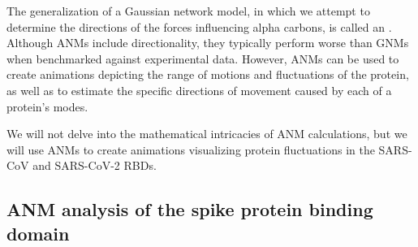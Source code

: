 The generalization of a Gaussian network model, in which we attempt to determine the directions of the forces influencing alpha carbons, is called an . Although ANMs include directionality, they typically perform worse than GNMs when benchmarked against experimental data. However, ANMs can be used to create animations depicting the range of motions and fluctuations of the protein, as well as to estimate the specific directions of movement caused by each of a protein's modes.

We will not delve into the mathematical intricacies of ANM calculations, but we will use ANMs to create animations visualizing protein fluctuations in the SARS-CoV and SARS-CoV-2 RBDs.

%
%
%

\FloatBarrier
{}
\subsection{ANM analysis of the spike protein binding domain}

